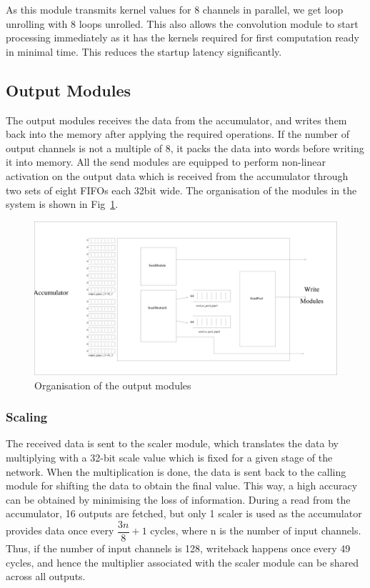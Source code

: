 \documentclass[a4paper,12pt, final]{report}
\begin{document}
As this module transmits kernel values for 8 channels in parallel, we get loop unrolling with 8 loops unrolled. This also allows the convolution module to start processing immediately as it has the kernels required for first computation ready in minimal time. This reduces the startup latency significantly.

\subsection{Output Modules}

The output modules receives the data from the accumulator, and writes them back into the memory after applying the required operations. If the number of output channels is not a multiple of 8, it packs the data into words before writing it into memory. All the send modules are equipped to perform non-linear activation on the output data which is received from the accumulator through two sets of eight FIFOs each 32bit wide. The organisation of the modules in the system is shown in Fig~\ref{fig:outputModules}.

\begin{figure}[h!]
    \centering
    \includegraphics[width=\textwidth]{outputModule.pdf}
    \caption{Organisation of the output modules}
    \label{fig:outputModules}
\end{figure}
\subsubsection{Scaling}

The received data is sent to the scaler module, which translates the data by multiplying with a 32-bit scale value which is fixed for a given stage of the network. When the multiplication is done, the data is sent back to the calling module for shifting the data to obtain the final value. This way, a high accuracy can be obtained by minimising the loss of information. During a read from the accumulator, 16 outputs are fetched, but only 1 scaler is used as the accumulator provides data once every $\dfrac{3n}{8}+ 1$ cycles, where n is the number of input channels. Thus, if the number of input channels is 128, writeback happens once every 49 cycles, and hence the multiplier associated with the scaler module can be shared across all outputs.
\end{document}
